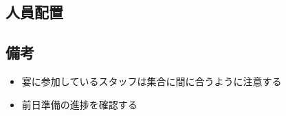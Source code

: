 \subsection{人員配置}

\subsection{備考}
\begin{itemize}
  \item 宴に参加しているスタッフは集合に間に合うように注意する
  \item 前日準備の進捗を確認する
\end{itemize}

%
